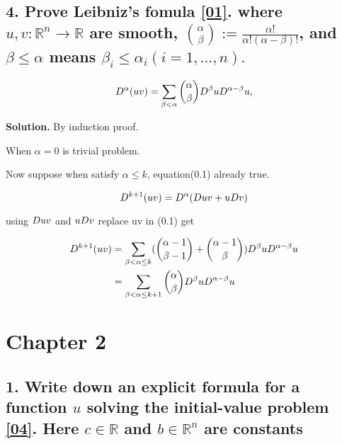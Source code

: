 \documentclass[a4paper]{book}
\newenvironment{solution}%
{\noindent\textbf{Solution.}}%
{\qedhere}
\numberwithin{equation}{chapter}
\theoremstyle{definition}
\begin{document}
\begin{multicols}{2}
\subsection{4. Prove Leibniz's fomula \ref{01}. where $u,v:\mathbb{R}^n \rightarrow \mathbb{R} $ are smooth, $\binom{\alpha}{\beta} := \frac{\alpha!}{\alpha!(\alpha - \beta)!}$, and $\beta \leq \alpha $ means $\beta_{i} \leq \alpha_{i}  (i = 1,...,n).$}
\begin{large}
	\begin{equation}\label{01}
		\mathnormal{D}^\alpha (uv) = \sum_{\beta < \alpha}^{}\binom{\alpha}{\beta}
		\mathnormal{D}^\beta u \mathnormal{D}^{\alpha - \beta} u,
	\end{equation}
\end{large}

\begin{solution}
	By induction proof.
	
	When $\alpha = 0$ is trivial problem.
	
	Now suppose when satisfy $\alpha \leq k $, equation(0.1) already true.
	
	\begin{equation}
		\mathnormal{D}^{k+1} (uv) = \mathnormal{D}^\alpha (\mathnormal{D}uv + u\mathnormal{D}v) 
	\end{equation}
	
	using $\mathnormal{D}uv$ and $u\mathnormal{D}v$ replace uv in (0.1) get
	
	\begin{equation}
	\begin{split}
	\mathnormal{D}^{k+1} (uv) &= \sum_{\beta < \alpha \leq k}^{}( \binom{\alpha -1}{\beta - 1} + \binom{\alpha -1}{\beta})
	\mathnormal{D}^\beta u \mathnormal{D}^{\alpha - \beta} u \\
	&= \sum_{\beta < \alpha \leq k+1}^{}\binom{\alpha}{\beta}
	\mathnormal{D}^\beta u \mathnormal{D}^{\alpha - \beta} u
	\end{split}
	\end{equation}
\end{solution}
%

\section{Chapter 2}
\subsection{1. Write down an explicit formula for a function $u$ solving the initial-value problem \ref{04}. Here $c \in \mathbb{R}$ and $ b \in \mathbb{R}^n $ are constants}


\end{multicols}
\end{document}
